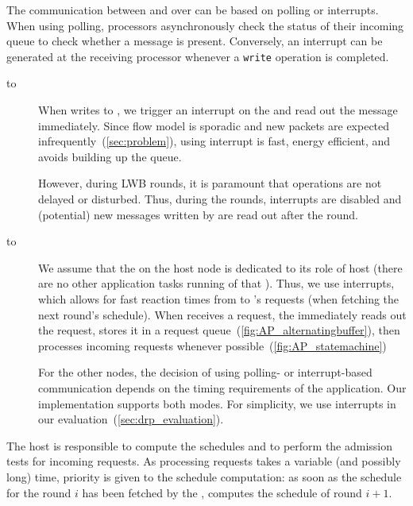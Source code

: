 The communication between \AP and \CP over \bolt can be based on polling or interrupts. When using polling, processors asynchronously check the status of their incoming \bolt queue to check whether a message is present. Conversely, an interrupt can be generated at the receiving processor whenever a \bolt \texttt{write} operation is completed.
\begin{description}

  \item[\AP to \CP]
  When \AP writes to \bolt, we trigger an interrupt on the \CP and read out the message immediately.
  Since \DRP flow model is sporadic and new packets are expected infrequently~(\cref{sec:problem}), using interrupt is fast, energy efficient, and avoids building up the \bolt queue.

  However, during LWB rounds, it is paramount that \CP operations are not delayed or disturbed. Thus, during the rounds, interrupts are disabled and (potential) new messages written by \AP are read out after the round.

  \item[\CP to \AP]
  We assume that the \AP on the host node is dedicated to its role of host (\ie there are no other application tasks running of that \AP).
  Thus, we use interrupts, which allows for fast reaction times from \AP to \CP's requests (\eg when fetching the next round's schedule).
  When \CP receives a \DRP request, the \AP immediately reads out the request, stores it in a request queue~(\cref{fig:AP_alternatingbuffer}), then processes incoming requests whenever possible~(\cref{fig:AP_statemachine})

  For the other nodes, the decision of using polling- or interrupt-based communication depends on the timing requirements of the application.
  Our implementation supports both modes.
  For simplicity, we use interrupts in our evaluation~(\cref{sec:drp_evaluation}).

\end{description}

The host \AP is responsible to compute the \blink schedules and to perform the admission tests for incoming \DRP requests. As processing \DRP requests takes a variable (and possibly long) time, priority is given to the schedule computation: as soon as the schedule for the round $i$ has been fetched by the \CP, \AP computes the schedule of round $i+1$.

